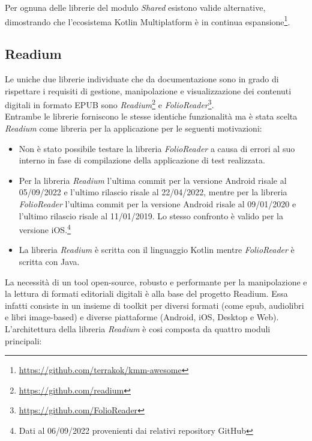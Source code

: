 Per ognuna delle librerie del modulo \textit{Shared} esistono valide alternative, dimostrando che l'ecosistema Kotlin Multiplatform è in continua espansione\footnote{\url{https://github.com/terrakok/kmm-awesome}}.

\subsection{Readium}
Le uniche due librerie individuate che da documentazione sono in grado di rispettare i requisiti di gestione, manipolazione e visualizzazione dei contenuti digitali in formato EPUB sono \textit{Readium}\footnote{\url{https://github.com/readium}} e \textit{FolioReader}\footnote{\url{https://github.com/FolioReader}}.\\
Entrambe le librerie forniscono le stesse identiche funzionalità ma è stata scelta \textit{Readium} come libreria per la applicazione per le seguenti motivazioni:
\begin{itemize}
    \item Non è stato possibile testare la libreria \textit{FolioReader} a causa di errori al suo interno in fase di compilazione della applicazione di test realizzata.
    \item Per la libreria \textit{Readium} l'ultima commit per la versione Android risale al 05/09/2022 e l'ultimo rilascio risale al 22/04/2022, mentre per la libreria \textit{FolioReader} l'ultima commit per la versione Android risale al 09/01/2020 e l'ultimo rilascio risale al 11/01/2019. Lo stesso confronto è valido per la versione iOS.\footnote{Dati al 06/09/2022 provenienti dai relativi repository GitHub}
    \item La libreria \textit{Readium} è scritta con il linguaggio Kotlin mentre \textit{FolioReader} è scritta con Java.
\end{itemize}
La necessità di un tool open-source, robusto e performante per la manipolazione e la lettura di formati editoriali digitali è alla base del progetto Readium. Essa infatti consiste in un insieme di toolkit per diversi formati (come epub, audiolibri e libri image-based) e diverse piattaforme (Android, iOS, Desktop e Web).\\
L'architettura della libreria \textit{Readium} è cosi composta da quattro moduli principali:
